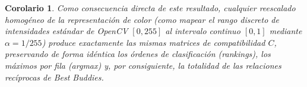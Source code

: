 \documentclass[a4paper]{article}
\theoremstyle{plain} %
\theoremstyle{plain} %
\newtheorem{corol}{Corolario}
\begin{document}
\begin{corol}
Como consecuencia directa de este resultado, cualquier reescalado homogéneo de la representación de color (como mapear el rango discreto de intensidades estándar de OpenCV 
$[0,255]$ al intervalo continuo $[0,1]$ mediante $\alpha = 1/255$) produce exactamente las mismas matrices de compatibilidad 
$C$, preservando de forma idéntica los órdenes de clasificación (rankings), los máximos por fila (argmax) 
y, por consiguiente, la totalidad de las relaciones recíprocas de Best Buddies.
\end{corol}
\end{document}
